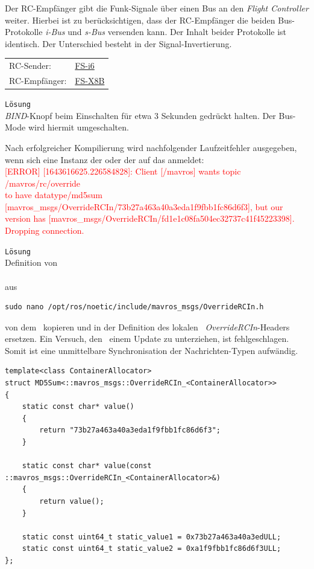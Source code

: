 Der RC-Empfänger gibt die Funk-Signale über einen Bus an den \textit{Flight Controller} weiter. Hierbei ist zu berücksichtigen, dass der RC-Empfänger die beiden  Bus-Protokolle \textit{i-Bus} und \textit{s-Bus} versenden kann. Der Inhalt beider Protokolle ist identisch. Der Unterschied besteht in der Signal-Invertierung.\\
\begin{table}[]
\begin{tabular}{ll}
RC-Sender:&\href{https://www.flysky-cn.com/i6-gaishu}{FS-i6}\\
RC-Empfänger:&\href{https://www.flysky-cn.com/x8b-canshu}{FS-X8B}
\end{tabular}
\end{table}

\texttt{Lösung}\\
\textit{BIND}-Knopf beim Einschalten für etwa 3 Sekunden gedrückt halten. Der Bus-Mode wird hiermit umgeschalten.


Nach erfolgreicher Kompilierung wird nachfolgender Laufzeitfehler ausgegeben, wenn sich eine Instanz der  oder der  auf das  anmeldet:\\
\textcolor{red}{[ERROR] [1643616625.226584828]: Client [/mavros] wants topic /mavros/rc/override \\to have datatype/md5sum [mavros\_msgs/OverrideRCIn/73b27a463a40a3eda1f9fbb1fc86d6f3], but our version has [mavros\_msgs/OverrideRCIn/fd1e1c08fa504ec32737c41f45223398]. Dropping connection.}

\texttt{Lösung}\\
Definition von \\ \\aus 
\begin{lstlisting}[style=Style_Bash, caption=Befehl zum Öffnen des \textit{OverrideRCIn}-Headers]
sudo nano /opt/ros/noetic/include/mavros_msgs/OverrideRCIn.h
\end{lstlisting}
von dem \Pie\ kopieren und in der Definition des lokalen \ROS\ \textit{\mbox{OverrideRCIn}}-Headers ersetzen.
Ein Versuch, den \Pie\ einem Update zu unterziehen, ist fehlgeschlagen. Somit ist eine unmittelbare Synchronisation der Nachrichten-Typen aufwändig.

\begin{lstlisting}[style=Style_CPP, numbers=none, caption=Definition des Struct \CodeStruct{MD5Sum} für das Template \textit{OverrideRCIn}]
template<class ContainerAllocator>
struct MD5Sum<::mavros_msgs::OverrideRCIn_<ContainerAllocator>>
{
	static const char* value()
	{
		return "73b27a463a40a3eda1f9fbb1fc86d6f3";
	}

	static const char* value(const ::mavros_msgs::OverrideRCIn_<ContainerAllocator>&)
	{
		return value();
	}
	
	static const uint64_t static_value1 = 0x73b27a463a40a3edULL;
	static const uint64_t static_value2 = 0xa1f9fbb1fc86d6f3ULL;
};
\end{lstlisting}



